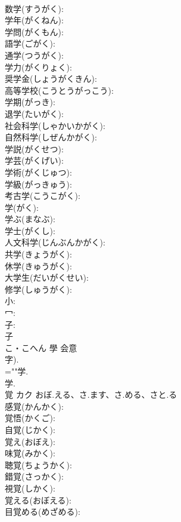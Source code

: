 \documentclass[8pt]{extreport}
\begin{document}
\begin{CJK}{UTF8}{min}
\\	数学(すうがく): 
\\	学年(がくねん): 
\\	学問(がくもん): 
\\	語学(ごがく): 
\\	通学(つうがく): 
\\	学力(がくりょく): 
\\	奨学金(しょうがくきん): 
\\	高等学校(こうとうがっこう): 
\\	学期(がっき): 
\\	退学(たいがく): 
\\	社会科学(しゃかいかがく): 
\\	自然科学(しぜんかがく): 
\\	学説(がくせつ): 
\\	学芸(がくげい): 
\\	学術(がくじゅつ): 
\\	学級(がっきゅう): 
\\	考古学(こうこがく): 
\\	学(がく): 
\\	学ぶ(まなぶ): 
\\	学士(がくし): 
\\	人文科学(じんぶんかがく): 
\\	共学(きょうがく): 
\\	休学(きゅうがく): 
\\	大学生(だいがくせい): 
\\	修学(しゅうがく): 
\\	小: 
\\	冖: 
\\	子: 
\\	子	
\\	こ・こへん	學	会意 
\\	字).	
\\	=""学.
\\	学.
\\	覚	カク	おぼ.える、さ.ます、さ.める、さと.る		
\\	感覚(かんかく): 
\\	覚悟(かくご): 
\\	自覚(じかく): 
\\	覚え(おぼえ): 
\\	味覚(みかく): 
\\	聴覚(ちょうかく): 
\\	錯覚(さっかく): 
\\	視覚(しかく): 
\\	覚える(おぼえる): 
\\	目覚める(めざめる): 

\end{CJK}
\end{document}

